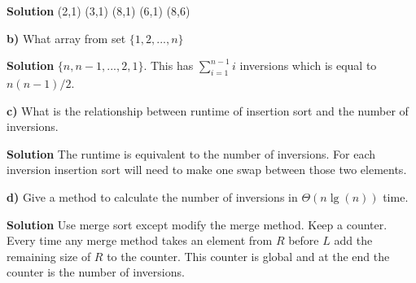 \documentclass{article}
\begin{document}
\textbf{Solution} (2,1) (3,1) (8,1) (6,1) (8,6)

\medskip

\textbf{b)} What array from set $\{1,2,...,n\}$

\medskip

\textbf{Solution} $\{n,n-1,...,2,1\}$. This has $\sum\limits_{i = 1}^{n-1} i$ inversions which is equal to $n(n-1)/2$.

\medskip

\textbf{c)} What is the relationship between runtime of insertion sort and the number of inversions.

\medskip

\textbf{Solution} The runtime is equivalent to the number of inversions. For each inversion insertion sort will need to make one swap between those two elements.

\medskip

\textbf{d)} Give a method to calculate the number of inversions in $\Theta(n\lg(n))$ time.

\medskip

\textbf{Solution} Use merge sort except modify the merge method. Keep a counter. Every time any merge method takes an element from $R$ before $L$ add the remaining size of $R$ to the counter. This counter is global and at the end the counter is the number of inversions.

\hrulefill
\end{document}
